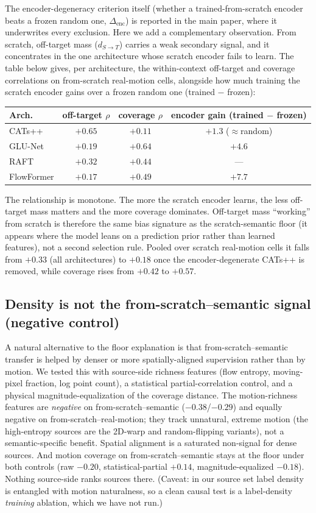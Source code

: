\documentclass[runningheads]{llncs}
\newcommand{\dtb}{d_{S\to T}}
\begin{document}
The encoder-degeneracy criterion itself (whether a trained-from-scratch encoder
beats a frozen random one, $\Delta_{\text{enc}}$) is reported in the main paper,
where it underwrites every exclusion. Here we add a complementary observation.
From scratch, off-target mass ($\dtb$) carries a weak secondary signal, and it
concentrates in the one architecture whose scratch encoder fails to learn. The table below gives, per
architecture, the within-context off-target and coverage correlations on
from-scratch real-motion cells, alongside how much training the scratch encoder
gains over a frozen random one (trained $-$ frozen):
\begin{center}\small
\begin{tabular}{lccc}
\toprule
Arch. & off-target $\rho$ & coverage $\rho$ & encoder gain (trained $-$ frozen) \\
\midrule
CATs++ & $+0.65$ & $+0.11$ & $+1.3$ (\(\approx\)random) \\
GLU-Net & $+0.19$ & $+0.64$ & $+4.6$ \\
RAFT & $+0.32$ & $+0.44$ & --- \\
FlowFormer & $+0.17$ & $+0.49$ & $+7.7$ \\
\bottomrule
\end{tabular}
\end{center}
The relationship is monotone. The more the scratch encoder learns, the
less off-target mass matters and the more coverage dominates. Off-target mass
``working'' from scratch is therefore the same bias signature as the
scratch-semantic floor (it appears where the model leans on a prediction prior
rather than learned features), not a second selection rule. Pooled over scratch
real-motion cells it falls from $+0.33$ (all architectures) to $+0.18$ once the
encoder-degenerate CATs++ is removed, while coverage rises from $+0.42$ to
$+0.57$.

\subsection{Density is not the from-scratch--semantic signal (negative control)}
A natural alternative to the floor explanation is that from-scratch--semantic
transfer is helped by denser or more spatially-aligned supervision rather than
by motion. We tested this with source-side richness features (flow entropy,
moving-pixel fraction, log point count), a statistical partial-correlation
control, and a physical magnitude-equalization of the coverage distance. The
motion-richness features are \emph{negative} on from-scratch--semantic
($-0.38$/$-0.29$) and equally negative on from-scratch--real-motion; they track
unnatural, extreme motion (the high-entropy sources are the 2D-warp and
random-flipping variants), not a semantic-specific benefit. Spatial alignment is
a saturated non-signal for dense sources. And motion coverage on
from-scratch--semantic stays at the floor under both controls (raw $-0.20$,
statistical-partial $+0.14$, magnitude-equalized $-0.18$). Nothing source-side
ranks sources there. (Caveat: in our source set
label density is entangled with motion naturalness, so a clean causal test is a
label-density \emph{training} ablation, which we have not run.)
\end{document}
